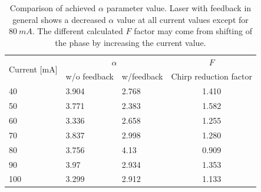 \begin{table}[ht]
    \centering
    \caption{Comparison of achieved $\alpha$ parameter value. Laser with feedback in general shows a decreased $\alpha$ value at all current values except for $80 \ mA$. The different calculated $F$ factor may come from shifting of the phase by increasing the current value.}
    \label{tab:chirp_alpha_comparison}
    \begin{tabular}{@{}llll@{}}
    \toprule
    \multirow{2}{*}{Current {[}mA{]}} & \multicolumn{2}{c}{$\alpha$} & \multicolumn{1}{c}{$F$} \\
                                      & w/o feedback   & w/feedback  & Chirp reduction factor  \\ \midrule
    40                                & 3.904          & 2.768       & \multicolumn{1}{c}{1.410}                   \\
    50                                & 3.771          & 2.383       & \multicolumn{1}{c}{1.582}                   \\
    60                                & 3.336          & 2.658       & \multicolumn{1}{c}{1.255}                   \\
    70                                & 3.837          & 2.998       & \multicolumn{1}{c}{1.280}                   \\
    80                                & 3.756          & 4.13        & \multicolumn{1}{c}{0.909}                   \\
    90                                & 3.97           & 2.934       & \multicolumn{1}{c}{1.353}                   \\
    100                               & 3.299          & 2.912       & \multicolumn{1}{c}{1.133}                   \\ \bottomrule
    \end{tabular}
\end{table}

